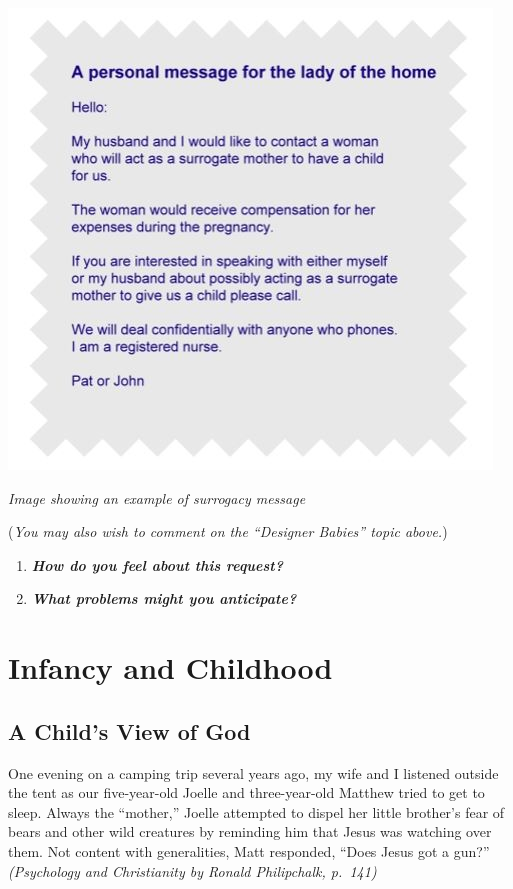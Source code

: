 \documentclass[
]{book}
\providecommand{\tightlist}{%
  \setlength{\itemsep}{0pt}\setlength{\parskip}{0pt}}
\begin{document}
\includegraphics{assets/unit_3/U3_T1_LearningACtivitity.JPG}

\emph{Image showing an example of surrogacy message }

(\emph{You may also wish to comment on the ``Designer Babies'' topic above.})

\begin{enumerate}
\def\labelenumi{\arabic{enumi}.}
\tightlist
\item
  \textbf{\emph{How do you feel about this request?}}
\item
  \textbf{\emph{What problems might you anticipate?}}
\end{enumerate}

\hypertarget{infancy-and-childhood}{%
\section{\texorpdfstring{\textbf{Infancy and Childhood}}{Infancy and Childhood}}\label{infancy-and-childhood}}

\hypertarget{a-childs-view-of-god}{%
\subsection*{A Child's View of God}\label{a-childs-view-of-god}}

One evening on a camping trip several years ago, my wife and I listened outside the tent as our five-year-old Joelle and three-year-old Matthew tried to get to sleep. Always the ``mother,'' Joelle attempted to dispel her little brother's fear of bears and other wild creatures by reminding him that Jesus was watching over them. Not content with generalities, Matt responded, ``Does Jesus got a gun?'' \emph{(Psychology and Christianity by Ronald Philipchalk, p.~141)}
\end{document}
